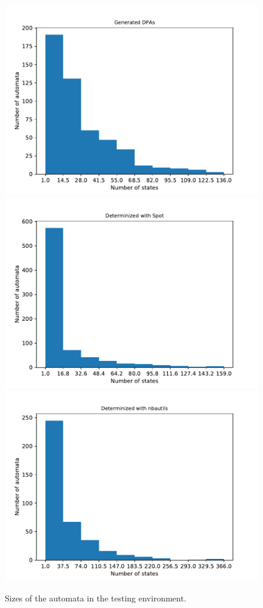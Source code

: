 \begin{figure}
\begin{minipage}{0.49\textwidth}
		\caption{Sizes of the automata in the testing environment.}
		\label{exp:fig:rawstats_size}
	\end{minipage}
	\hfill
	\begin{minipage}{0.49\textwidth}
		\includegraphics[page=2,height=.3\textheight]{../data/analysis/rawstats_gendet.pdf} 
		\includegraphics[page=2,height=.3\textheight]{../data/analysis/rawstats_detspot.pdf} 
		\includegraphics[page=2,height=.3\textheight]{../data/analysis/rawstats_detnbaut.pdf}

\end{minipage}
\end{figure}
